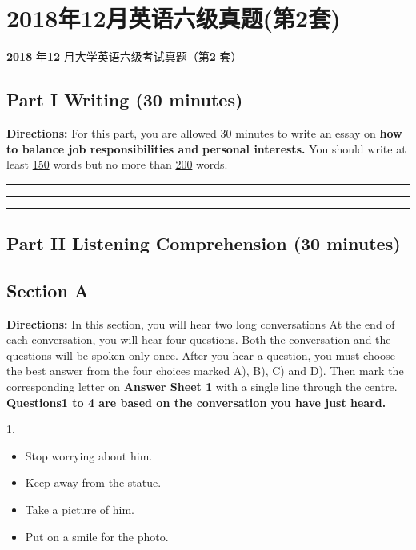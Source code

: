 \documentclass[UTF8,11pt]{ctexart}
\begin{document}
\section*{2018年12月英语六级真题(第2套)}
\textbf{2018} 年\textbf{12} 月大学英语六级考试真题（第\textbf{2} 套）


\subsection*{\textbf{Part I} \textbf{Writing} \textbf{(30 minutes)}}


\textbf{Directions:} For this part, you are allowed 30 minutes to write an essay on\textbf{ how to balance job responsibilities and} \textbf{personal interests.} You should write at least \uline{150} words but no more than \uline{200} words. \par\noindent\rule{.95\linewidth}{.4pt}\par  \par\noindent\rule{.95\linewidth}{.4pt}\par  \par\noindent\rule{.95\linewidth}{.4pt}\par


\subsection*{\textbf{Part II} \textbf{Listening Comprehension} \textbf{(30 minutes)}}


\subsection*{\textbf{Section A}}


\textbf{Directions:} In this section, you will hear two long conversations At the end of each conversation, you will hear four questions. Both the conversation and the questions will be spoken only once. After you hear a question, you must choose the best answer from the four choices marked A), B), C) and D). Then mark the corresponding letter on\textbf{ Answer Sheet 1} with a single line through the centre. \textbf{Questions1 to 4 are based on the conversation you have just heard.}


1.


\begin{itemize}[leftmargin=2em,itemsep=.2em,topsep=.4em]\item[A.] Stop worrying about him.
\item[B.] Keep away from the statue.
\item[C.] Take a picture of him.
\item[D.] Put on a smile for the photo.
\end{itemize}
\end{document}
